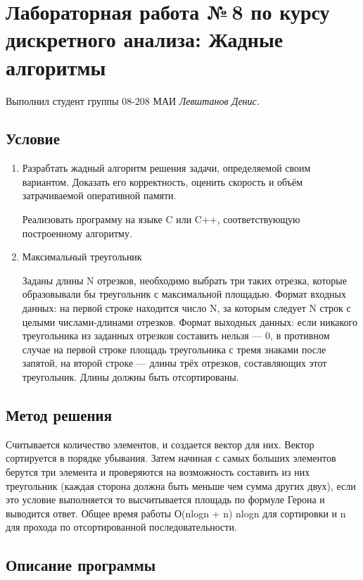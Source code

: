 \documentclass[12pt]{article}
\begin{document}
\section*{Лабораторная работа №\,8 по курсу дискретного анализа: Жадные алгоритмы}

Выполнил студент группы 08-208 МАИ \textit{Левштанов Денис}.

\subsection*{Условие}

\begin{enumerate}
\item Разрабтать жадный алгоритм решения задачи, определяемой своим вариантом. Доказать его корректность, оценить скорость и объём затрачиваемой оперативной памяти.

Реализовать программу на языке C или C++, соответствующую построенному алгоритму.
\item Максимальный треугольник

Заданы длины N отрезков, необходимо выбрать три таких отрезка, которые образовывали бы треугольник с максимальной площадью. Формат входных данных: на первой строке находится число N, за которым следует N строк с целыми числами-длинами отрезков. Формат выходных данных: если никакого треугольника из заданных отрезков составить нельзя — 0, в противном случае на первой строке площадь треугольника с тремя знаками после запятой, на второй строке — длины трёх отрезков, составляющих этот треугольник. Длины должны быть отсортированы.

\end{enumerate}

\subsection*{Метод решения}
\par Считывается количество элементов, и создается вектор для них. Вектор сортируется в порядке убывания. Затем начиная с самых больших элементов берутся три элемента и проверяются на возможность составить из них треугольник (каждая сторона должна быть меньше чем сумма других двух), если это условие выполняется то высчитывается площадь по формуле Герона и выводится ответ. Общее время работы О(nlogn + n) nlogn для сортировки и n для прохода по отсортированной последовательности.

\subsection*{Описание программы}
\end{document}
